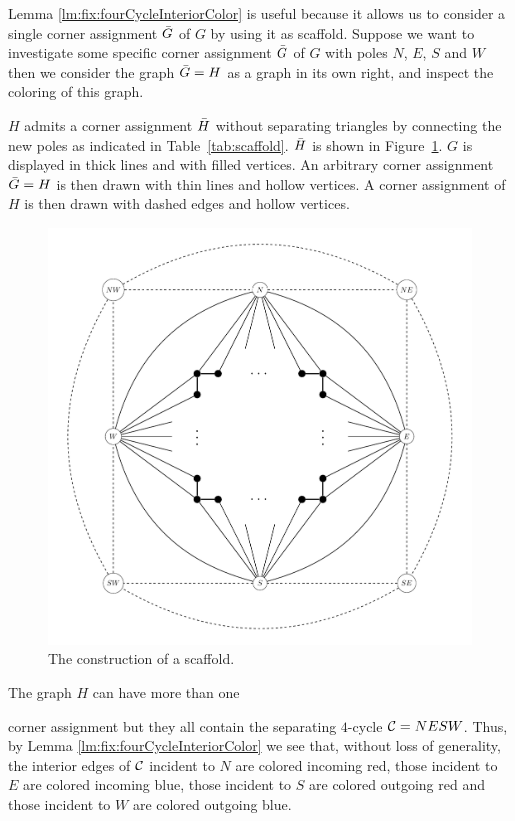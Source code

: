   Lemma \ref{lm:fix:fourCycleInteriorColor} is useful because it allows us to consider a single corner assignment $\bar{G}$ of $G$ by using it as scaffold. Suppose we want to investigate some specific corner assignment $\bar{G}$ of $G$ with poles $N$, $E$, $S$ and $W$ then we consider the graph $\bar{G} = H$ as a graph in its own right, and inspect the coloring of this graph.

  $H$ admits a corner assignment $\bar{H}$ without separating triangles by connecting the new poles as indicated in Table~\ref{tab:scaffold}.
  $\bar{H}$ is shown in Figure~\ref{fig:scafold}.
  $G$ is displayed in thick lines and with filled vertices.
  An arbitrary corner assignment $\bar{G} =H$ is then drawn with thin lines and hollow vertices.
  A corner assignment of $H$ is then drawn with dashed edges and hollow vertices.

  \begin{figure}
    \centering
    \includegraphics[scale=0.4]{fixExtension/img/scafold}
    \caption{The construction of a scaffold.
    \label{fig:scafold}}
  \end{figure}

  The graph $H$ can have more than one

  \noindent %
  corner assignment but they all contain the separating $4$-cycle $\mathcal{C}= NESW$. Thus, by Lemma \ref{lm:fix:fourCycleInteriorColor} we see that, without loss of generality, the interior edges of $\mathcal{C}$ incident to $N$ are colored incoming red, those incident to $E$ are colored incoming blue, those incident to $S$ are colored outgoing red and those incident to $W$ are colored outgoing blue.


